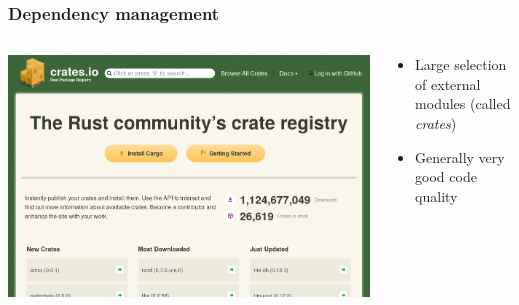 \documentclass[aspectratio=169]{beamer}
\begin{document}
\begin{frame}
  \frametitle{Dependency management}

  \begin{columns}
    \begin{column}{.5\linewidth}
      \includegraphics[width=\linewidth]{figs/screenshots/presentation-20190612-103959}
    \end{column}

    \begin{column}{.5\linewidth}
      \begin{itemize}
      \item Large selection of external modules (called \emph{crates})
      \item Generally very good code quality
      \end{itemize}
    \end{column}

  \end{columns}

\end{frame}
\end{document}
